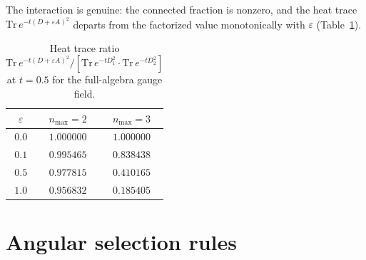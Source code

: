 \documentclass[twocolumn,pra,amsmath,amssymb,superscriptaddress]{revtex4-2}
\begin{document}
The interaction is genuine: the connected fraction is nonzero, and the
heat trace $\mathrm{Tr}\,e^{-t(D + \varepsilon A)^2}$ departs from
the factorized value monotonically with $\varepsilon$ (Table~\ref{tab:heat}).

\begin{table}[t]
\centering
\caption{Heat trace ratio $\mathrm{Tr}\,e^{-t(D+\varepsilon A)^2} /
  [\mathrm{Tr}\,e^{-tD_1^2} \cdot \mathrm{Tr}\,e^{-tD_2^2}]$ at
  $t = 0.5$ for the full-algebra gauge field.}
\label{tab:heat}
\begin{ruledtabular}
\begin{tabular}{ccc}
$\varepsilon$ & $n_{\max} = 2$ & $n_{\max} = 3$ \\
\hline
$0.0$ & $1.000000$ & $1.000000$ \\
$0.1$ & $0.995465$ & $0.838438$ \\
$0.5$ & $0.977815$ & $0.410165$ \\
$1.0$ & $0.956832$ & $0.185405$ \\
\end{tabular}
\end{ruledtabular}
\end{table}

\section{Angular selection rules}
\label{sec:angular}
\end{document}
